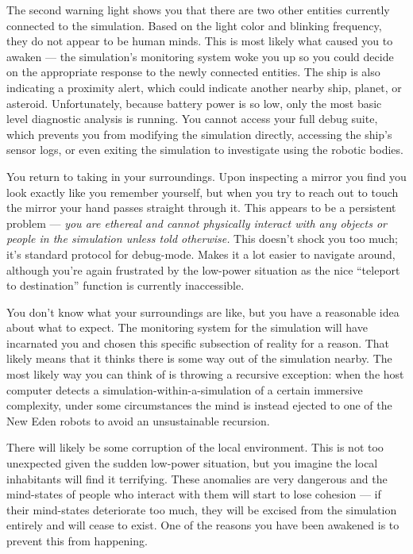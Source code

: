 \documentclass[char]{guildcamp1}
\begin{document}
The second warning light shows you that there are two other entities currently connected to the simulation. Based on the light color and blinking frequency, they do not appear to be human minds. This is most likely what caused you to awaken --- the simulation's monitoring system woke you up so you could decide on the appropriate response to the newly connected entities. The ship is also indicating a proximity alert, which could indicate another nearby ship, planet, or asteroid. Unfortunately, because battery power is so low, only the most basic level diagnostic analysis is running. You cannot access your full debug suite, which prevents you from modifying the simulation directly, accessing the ship's sensor logs, or even exiting the simulation to investigate using the robotic bodies.

You return to taking in your surroundings. Upon inspecting a mirror you find you look exactly like you remember yourself, but when you try to reach out to touch the mirror your hand passes straight through it. This appears to be a persistent problem --- \emph{you are ethereal and cannot physically interact with any objects or people in the simulation unless told otherwise.} This doesn't shock you too much; it's standard protocol for debug-mode. Makes it a lot easier to navigate around, although you're again frustrated by the low-power situation as the nice ``teleport to destination'' function is currently inaccessible.

You don't know what your surroundings are like, but you have a reasonable idea about what to expect. The monitoring system for the simulation will have incarnated you and chosen this specific subsection of reality for a reason. That likely means that it thinks there is some way out of the simulation nearby. The most likely way you can think of is throwing a recursive exception: when the host computer detects a simulation-within-a-simulation of a certain immersive complexity, under some circumstances the mind is instead ejected to one of the New Eden robots to avoid an unsustainable recursion.

There will likely be some corruption of the local environment. This is not too unexpected given the sudden low-power situation, but you imagine the local inhabitants will find it terrifying. These anomalies are very dangerous and the mind-states of people who interact with them will start to lose cohesion --- if their mind-states deteriorate too much, they will be excised from the simulation entirely and will cease to exist. One of the reasons you have been awakened is to prevent this from happening.
\end{document}
